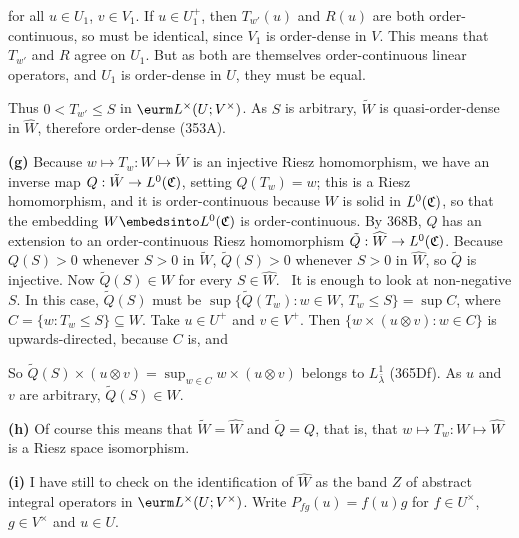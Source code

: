 {

\noindent for all $u\in U_1$, $v\in V_1$.   If $u\in U_1^+$, then
$T_{w'}(u)$ and $R(u)$ are both order-continuous, so must be identical,
since $V_1$ is order-dense in $V$.   This means that $T_{w'}$ and $R$
agree on $U_1$.   But as both are themselves
order-continuous linear operators, and $U_1$ is order-dense in $U$, they
must be equal.

Thus $0<T_{w'}\le S$ in $\eurm L^{\times}(U;V^{\times})$.   As $S$ is
arbitrary, $\tilde W$ is quasi-order-dense in $\widehat{W}$, therefore
order-dense (353A).\ \Qed

\medskip

{\bf (g)} Because $w\mapsto T_w:W\mapsto\tilde W$ is an injective Riesz
homomorphism, we have an inverse map $Q:\tilde W\to L^0(\frak C)$,
setting $Q(T_w)=w$;  this is a Riesz homomorphism, and it is
order-continuous because $W$ is solid in $L^0(\frak C)$, so that the
embedding $W\embedsinto L^0(\frak C)$ is order-continuous.   By 368B, $Q$
has an extension to an order-continuous Riesz homomorphism
$\tilde Q:\widehat{W}\to L^0(\frak C)$.
Because $Q(S)>0$ whenever $S>0$ in
$\tilde W$, $\tilde Q(S)>0$ whenever $S>0$ in $\widehat{W}$, so
$\tilde Q$ is injective.
Now $\tilde Q(S)\in W$ for every $S\in\widehat{W}$.
\Prf\ It is enough to look at non-negative $S$.   In this case,
$\tilde Q(S)$ must be $\sup\{\tilde Q(T_w):w\in W,\,T_w\le S\}=\sup C$,
where $C=\{w:T_w\le S\}\subseteq W$.   Take $u\in U^+$ and $v\in V^+$.
Then $\{w\times(u\otimes v):w\in C\}$ is upwards-directed, because $C$ is,
and


\noindent So
$\tilde Q(S)\times(u\otimes v)=\sup_{w\in C}w\times(u\otimes v)$ belongs
to $L^1_{\bar\lambda}$ (365Df).   As $u$ and $v$
are arbitrary, $\tilde Q(S)\in W$.\ \Qed

\medskip

{\bf (h)} Of course this means that $\tilde W=\widehat{W}$ and
$\tilde Q=Q$,
that is, that $w\mapsto T_w:W\mapsto\widehat{W}$ is a Riesz space
isomorphism.

\medskip

{\bf (i)} I have still to check on the identification of $\widehat{W}$
as the band $Z$ of abstract integral operators in
$\eurm L^{\times}(U;V^{\times})$.   Write $P_{fg}(u)=f(u)g$ for
$f\in U^{\times}$, $g\in V^{\times}$ and $u\in U$.

}
